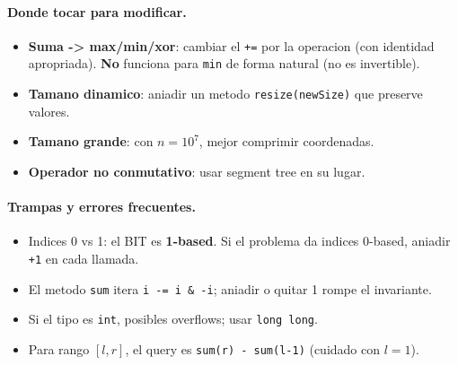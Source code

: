 \paragraph{Donde tocar para modificar.}
\begin{itemize}\setlength\itemsep{0pt}
	\item \textbf{Suma -> max/min/xor}: cambiar el \texttt{+=} por la operacion (con identidad apropriada). \textbf{No} funciona para \texttt{min} de forma natural (no es invertible).
	\item \textbf{Tamano dinamico}: aniadir un metodo \texttt{resize(newSize)} que preserve valores.
	\item \textbf{Tamano grande}: con $n = 10^7$, mejor comprimir coordenadas.
	\item \textbf{Operador no conmutativo}: usar segment tree en su lugar.
\end{itemize}

\paragraph{Trampas y errores frecuentes.}
\begin{itemize}\setlength\itemsep{0pt}
	\item Indices 0 vs 1: el BIT es \textbf{1-based}. Si el problema da indices 0-based, aniadir \texttt{+1} en cada llamada.
	\item El metodo \texttt{sum} itera \texttt{i -= i \& -i}; aniadir o quitar 1 rompe el invariante.
	\item Si el tipo es \texttt{int}, posibles overflows; usar \texttt{long long}.
	\item Para rango $[l, r]$, el query es \texttt{sum(r) - sum(l-1)} (cuidado con $l = 1$).
\end{itemize}

